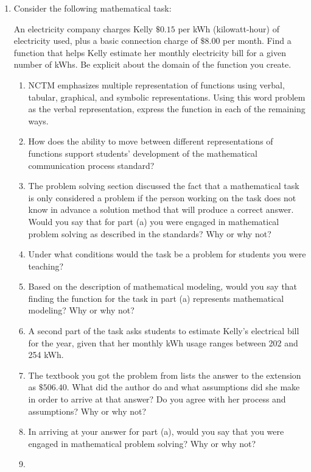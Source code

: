 \documentclass[
]{book}
\theoremstyle{definition}
\theoremstyle{definition}
\theoremstyle{definition}
\theoremstyle{definition}
\theoremstyle{remark}
\begin{document}
\begin{enumerate}
\def\labelenumi{\arabic{enumi}.}
\item
  Consider the following mathematical task:

  An electricity company charges Kelly \(\$0.15\) per kWh (kilowatt-hour) of electricity used, plus a basic connection charge of \(\$8.00\) per month. Find a function that helps Kelly estimate her monthly electricity bill for a given number of kWhs. Be explicit about the domain of the function you create.

  \begin{enumerate}
  \def\labelenumii{\alph{enumii})}
  \item
    NCTM emphasizes multiple representation of functions using verbal, tabular, graphical, and symbolic representations. Using this word problem as the verbal representation, express the function in each of the remaining ways.
  \item
    How does the ability to move between different representations of functions support students' development of the mathematical communication process standard?
  \item
    The problem solving section discussed the fact that a mathematical task is only considered a problem if the person working on the task does not know in advance a solution method that will produce a correct answer. Would you say that for part (a) you were engaged in mathematical problem solving as described in the standards? Why or why not?
  \item
    Under what conditions would the task be a problem for students you were teaching?
  \item
    Based on the description of mathematical modeling, would you say that finding the function for the task in part (a) represents mathematical modeling? Why or why not?
  \item
    A second part of the task asks students to estimate Kelly's electrical bill for the year, given that her monthly kWh usage ranges between 202 and 254 kWh.
  \item
    The textbook you got the problem from lists the answer to the extension as \(\$506.40\). What did the author do and what assumptions did she make in order to arrive at that answer? Do you agree with her process and assumptions? Why or why not?
  \item
    In arriving at your answer for part (a), would you say that you were engaged in mathematical problem solving? Why or why not?
  \item

\end{enumerate}
\end{enumerate}
\end{document}
